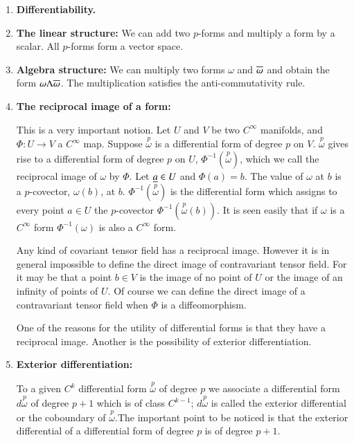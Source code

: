 \begin{enumerate}
\item {\bf Differentiability.}

\item {\bf The linear structure:} We can add two $p$-forms and
  multiply a form by a scalar. All $p$-forms form a vector space.

\item {\bf Algebra structure:} We can multiply two forms $\omega$ and
  $\overline{\omega}$ and obtain the form $\omega\Lambda\overline{\omega}$. The
  multiplication satisfies the anti-commuta\-ti\-vity rule.

\item {\bf The reciprocal image of a form:}\pageoriginale

This is a very important notion. Let $U$ and $V$ be two $C^{\infty}$
manifolds, and $\Phi:U\to V$ a $C^{\infty}$ map. Suppose
$\overset{p}{\omega}$ is a differential form of degree $p$ on
$V$. $\overset{p}{\omega}$ gives rise to a differential form of degree
$p$ on $U$, $\Phi^{-1}(\overset{p}{\omega})$, which we call the
reciprocal image of $\omega$ by $\Phi$. Let $\underline{a}\in U$ and
$\Phi(a)=b$. The value of $\omega$ at $b$ is a $p$-covector,
$\omega(b)$, at $b$. $\Phi^{-1}(\overset{p}{\omega})$ is the
differential form which assigns to every point $a\in U$ the
$p$-covector $\Phi^{-1}(\overset{p}{\omega}(b))$. It is seen easily
that if $\omega$ is a $C^{\infty}$ form $\Phi^{-1}(\omega)$ is also a
$C^{\infty}$ form.


Any kind of covariant tensor field has a reciprocal image. However it
is in general impossible to define the direct image of contravariant
tensor field. For it may be that a point $b\in V$ is the image of no
point of $U$ or the image of an infinity of points of $U$. Of course
we can define the direct image of a contravariant tensor field when
$\Phi$ is a diffeomorphism.

One of the reasons for the utility of differential forms is that they
have a reciprocal image. Another is the possibility of exterior
differentiation. 

\item {\bf Exterior differentiation:}

To a given $C^{k}$ differential form $\overset{p}{\omega}$ of degree
$p$ we associate a differential form $d\overset{p}{\omega}$ of degree
$p+1$ which is of class $C^{k-1}$; $d\overset{p}{\omega}$ is called
the exterior differential or the coboundary of
$\overset{p}{\omega}$.\pageoriginale The important point to be noticed
is that the exterior differential of a differential form of degree $p$
is of degree $p+1$.
\end{enumerate}

